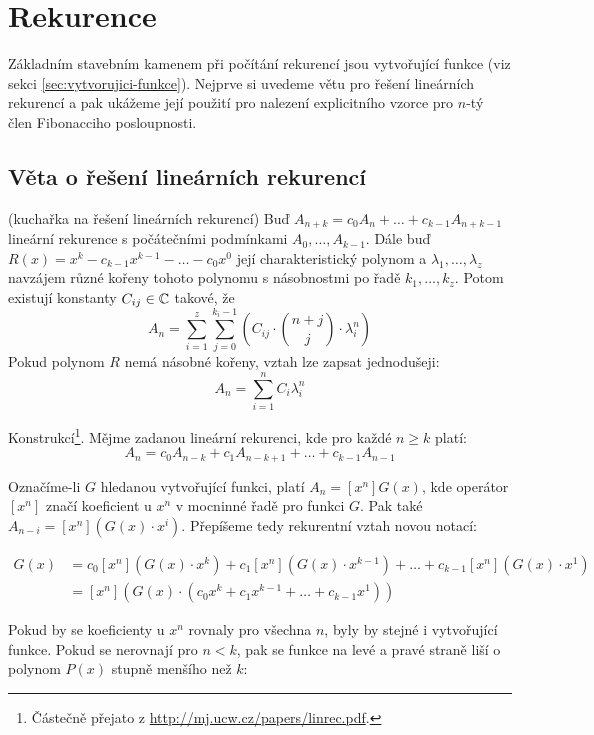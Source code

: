 \section{Rekurence}
\label{sec:rekurence}

Základním stavebním kamenem při počítání rekurencí jsou vytvořující funkce (viz
sekci \ref{sec:vytvorujici-funkce}). Nejprve si uvedeme větu pro řešení
lineárních rekurencí a pak ukážeme její použití pro nalezení explicitního
vzorce pro $n$-tý člen Fibonacciho posloupnosti.

\subsection{Věta o řešení lineárních rekurencí}

\vt (kuchařka na řešení lineárních rekurencí) Buď $A_{n+k} = c_0A_n + \dots +
c_{k-1}A_{n+k-1}$ lineární rekurence s počátečními podmínkami
$A_0,\dots,A_{k-1}$. Dále buď $R(x) = x^k - c_{k-1}x^{k-1} - \dots - c_0x^0$
její charakteristický polynom a $\lambda_1,\dots,\lambda_z$ navzájem různé
kořeny tohoto polynomu s násobnostmi po řadě $k_1,\dots,k_z$. Potom existují
konstanty $C_{ij} \in \mathbb{C}$ takové, že
$$A_n = \sum_{i=1}^z\sum_{j=0}^{k_i-1}\left(C_{ij}\cdot{n+j\choose j}\cdot\lambda_i^n\right)$$
Pokud polynom $R$ nemá násobné kořeny, vztah lze zapsat jednodušeji:
$$A_n = \sum_{i=1}^nC_i\lambda_i^n$$

\dk Konstrukcí\footnote{Částečně přejato z \url{http://mj.ucw.cz/papers/linrec.pdf}.}. Mějme zadanou lineární rekurenci, kde pro každé $n\ge k$ platí:
$$A_n = c_0A_{n-k} + c_1A_{n-k+1} + \dots + c_{k-1}A_{n-1}$$

Označíme-li $G$ hledanou vytvořující funkci, platí $A_n = [x^n]G(x)$, kde
operátor $[x^n]$ značí koeficient u $x^n$ v mocninné řadě pro funkci $G$. Pak
také $A_{n-i} = [x^n](G(x)\cdot x^i)$. Přepíšeme tedy rekurentní vztah novou
notací:

\begin{align}
[x^n]G(x) &= c_0[x^n](G(x)\cdot x^k) + c_1[x^n](G(x)\cdot x^{k-1}) + \dots + c_{k-1}[x^n](G(x)\cdot x^1) \\
&= [x^n]\left(G(x)\cdot (c_0x^k + c_1x^{k-1} + \dots + c_{k-1}x^1)\right)\end{align}

Pokud by se koeficienty u $x^n$ rovnaly pro všechna $n$, byly by stejné i
vytvořující funkce. Pokud se nerovnají pro $n<k$, pak se funkce na levé a pravé
straně liší o polynom $P(x)$ stupně menšího než $k$:

